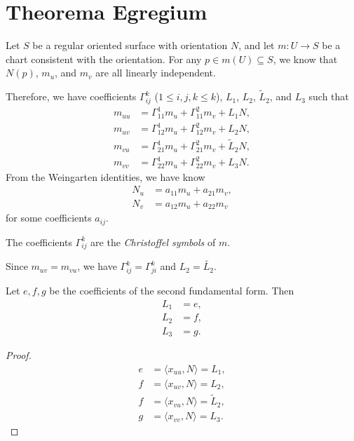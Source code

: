 \section{Theorema Egregium}

\begin{defn}
    Let $S$ be a regular oriented surface with orientation $N$, and let $m: U \to S$ be a chart consistent with the orientation. For any $p \in m(U) \subseteq S$, we know that $N(p)$, $m_u$, and $m_v$ are all linearly independent.

    Therefore, we have coefficients $\Gamma_{ij}^{k}$ ($1 \leq i,j,k \leq k$), $L_1$, $L_2$, $\tilde{L}_2$, and $L_3$ such that
    \begin{align*}
        m_{uu} &= \Gamma_{11}^{1}m_u + \Gamma_{11}^{2}m_v + L_1N, \\
        m_{uv} &= \Gamma_{12}^{1}m_u + \Gamma_{12}^{2}m_v + L_2N, \\
        m_{vu} &= \Gamma_{21}^{1}m_u + \Gamma_{21}^{2}m_v + \tilde{L}_2N, \\
        m_{vv} &= \Gamma_{22}^{1}m_u + \Gamma_{22}^{2}m_v + L_3N.
    \end{align*}
    From the Weingarten identities, we have know
    \begin{align*}
        N_u &= a_{11}m_u + a_{21}m_v, \\
        N_v &= a_{12}m_u + a_{22}m_v
    \end{align*}
    for some coefficients $a_{ij}$.

    The coefficients $\Gamma_{ij}^{k}$ are the \emph{Christoffel symbols} of $m$.
\end{defn}

\begin{rmk}
    Since $m_{uv} = m_{vu}$, we have $\Gamma_{ij}^{k} = \Gamma_{ji}^{k}$ and $L_2 = \tilde{L_2}$.
\end{rmk}

\begin{lemma}
    Let $e, f, g$ be the coefficients of the second fundamental form. Then
    \begin{align*}
        L_1 &= e, \\
        L_2 &= f, \\
        L_3 &= g.
    \end{align*}
\end{lemma}

\begin{proof}
    \begin{align*}
        e &= \langle x_{uu}, N\rangle = L_1, \\
        f &= \langle x_{uv}, N\rangle = L_2, \\
        f &= \langle x_{vu}, N\rangle = \tilde{L}_2, \\
        g &= \langle x_{vv}, N\rangle = L_3.
    \end{align*}
\end{proof}

